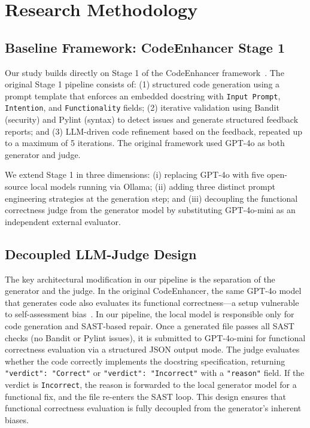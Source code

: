 \documentclass[runningheads]{llncs}
\begin{document}
\section{Research Methodology}
\label{sec:methodology}

\subsection{Baseline Framework: CodeEnhancer Stage 1}

Our study builds directly on Stage 1 of the CodeEnhancer framework~\cite{lee2026codeenhancer}. The original Stage 1 pipeline consists of: (1) structured code generation using a prompt template that enforces an embedded docstring with \texttt{Input Prompt}, \texttt{Intention}, and \texttt{Functionality} fields; (2) iterative validation using Bandit (security) and Pylint (syntax) to detect issues and generate structured feedback reports; and (3) LLM-driven code refinement based on the feedback, repeated up to a maximum of 5 iterations. The original framework used GPT-4o as both generator and judge.

We extend Stage 1 in three dimensions: (i) replacing GPT-4o with five open-source local models running via Ollama; (ii) adding three distinct prompt engineering strategies at the generation step; and (iii) decoupling the functional correctness judge from the generator model by substituting GPT-4o-mini as an independent external evaluator.

\subsection{Decoupled LLM-Judge Design}

The key architectural modification in our pipeline is the separation of the generator and the judge. In the original CodeEnhancer, the same GPT-4o model that generates code also evaluates its functional correctness---a setup vulnerable to self-assessment bias~\cite{olausson2024selfrepair}. In our pipeline, the local model is responsible only for code generation and SAST-based repair. Once a generated file passes all SAST checks (no Bandit or Pylint issues), it is submitted to GPT-4o-mini for functional correctness evaluation via a structured JSON output mode. The judge evaluates whether the code correctly implements the docstring specification, returning \texttt{"verdict": "Correct"} or \texttt{"verdict": "Incorrect"} with a \texttt{"reason"} field. If the verdict is \texttt{Incorrect}, the reason is forwarded to the local generator model for a functional fix, and the file re-enters the SAST loop. This design ensures that functional correctness evaluation is fully decoupled from the generator's inherent biases.
\end{document}
